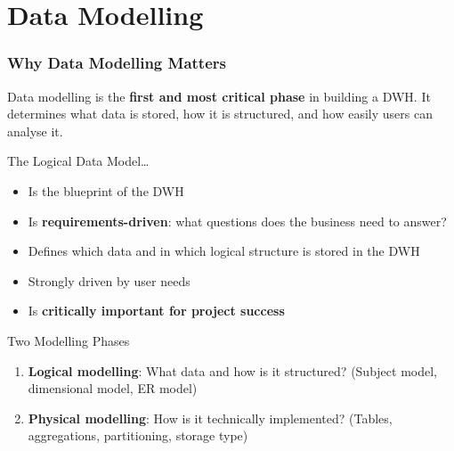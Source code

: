 \section{Data Modelling}


\begin{frame}
  \frametitle{Why Data Modelling Matters}

  Data modelling is the \textbf{first and most critical phase} in building a DWH.
  It determines what data is stored, how it is structured, and how easily
  users can analyse it.

  \begin{block}{The Logical Data Model\ldots}
    \begin{itemize}
      \item Is the blueprint of the DWH
      \item Is \textbf{requirements-driven}: what questions does the business need to answer?
      \item Defines which data and in which logical structure is stored in the DWH
      \item Strongly driven by user needs
      \item Is \textbf{critically important for project success}
    \end{itemize}
  \end{block}

  \begin{block}{Two Modelling Phases}
    \begin{enumerate}
      \item \textbf{Logical modelling}: What data and how is it structured?
        (Subject model, dimensional model, ER model)
      \item \textbf{Physical modelling}: How is it technically implemented?
        (Tables, aggregations, partitioning, storage type)
    \end{enumerate}
  \end{block}
\end{frame}


